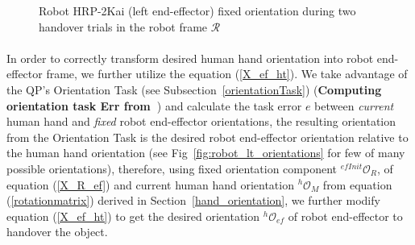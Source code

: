 \documentclass[a4paper, 12pt, oneside]{Thesis}  %
\begin{document}
\begin{figure}[ht]
	\caption{Robot HRP-2Kai (left end-effector) fixed orientation during two handover trials in the robot frame $\mathcal{R}$}
	\label{fig:robot_lt_hand_2layers}
\end{figure} 

\paragraph*{}
In order to correctly transform desired human hand orientation into robot end-effector frame, we further utilize the equation (\ref{X_ef_ht}). We take advantage of the QP's Orientation Task (see Subsection~\ref{orientationTask}) (\textbf{Computing orientation task Err from~\cite{ladder-HRP-2Kai}}) and calculate the task error $e$ between \textit{current} human hand and \textit{fixed} robot end-effector orientations, the resulting orientation from the Orientation Task is the desired robot end-effector orientation relative to the human hand orientation (see Fig~\ref{fig:robot_lt_orientations} for few of many possible orientations), therefore, using fixed orientation component  ${{}^{efInit}\mathcal{O}_R}$, of equation (\ref{X_R_ef}) and current human hand orientation ${}^{h}\mathcal{O}_M$ from equation (\ref{rotationmatrix}) derived in Section~\ref{hand_orientation}, we further modify equation (\ref{X_ef_ht}) to get the desired orientation $ {}^{h}\mathcal{O}_{ef} $ of robot end-effector to handover the object.
\end{document}
